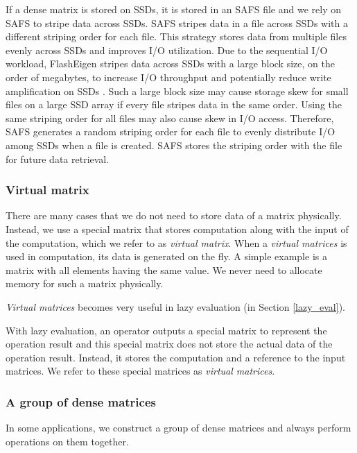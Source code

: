 If a dense matrix is stored on SSDs, it is stored in an SAFS file and we rely
on SAFS to stripe data across SSDs. SAFS stripes data in a file across SSDs
with a different striping order for each file.
This strategy stores data from multiple files evenly across SSDs and improves
I/O utilization. Due to the sequential I/O workload, FlashEigen stripes data
across SSDs with a large block size, on the order of megabytes, to increase I/O
throughput and potentially reduce write amplification on SSDs \cite{Tang15}.
Such a large block size may cause storage skew for small files
on a large SSD array if every file stripes data in the same order. Using
the same striping order for all files may also cause skew in I/O access.
Therefore, SAFS generates a random striping order for each file to evenly
distribute I/O among SSDs when a file is created. SAFS stores the striping
order with the file for future data retrieval.

\subsubsection{Virtual matrix} \label{virt_mat}
There are many cases that we do not need to store data of a matrix physically.
Instead, we use a special matrix that stores computation along with the input
of the computation, which we refer to as \textit{virtual matrix}. When a
\textit{virtual matrices} is used in computation, its data is generated on
the fly. A simple example is a matrix with all elements having the same value.
We never need to allocate memory for such a matrix physically.

\textit{Virtual matrices} becomes very useful in lazy evaluation (in Section
\ref{lazy_eval}).


With lazy evaluation, an operator outputs a special matrix to represent
the operation result and this special matrix does not store the actual data of
the operation result. Instead, it stores the computation and a reference to
the input matrices. We refer to these special matrices as
\textit{virtual matrices}.

\subsubsection{A group of dense matrices}
In some applications, we construct a group of dense matrices and always perform
operations on them together.


